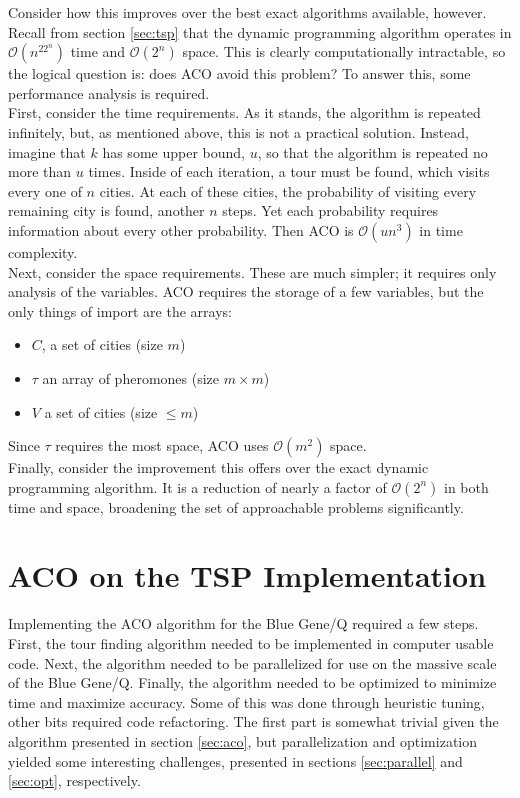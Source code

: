 \documentclass[twocolumn]{article}
\begin{document}
Consider how this improves over the best exact algorithms available, however. 
Recall from section
\ref{sec:tsp} that the dynamic programming algorithm operates in $\mathcal{O}(n^22^n)$ time
and $\mathcal{O}(2^n)$ space. This is clearly computationally intractable, so the logical
question is: does ACO avoid this problem? To answer this, some performance analysis is 
required. \\

First, consider the time requirements. As it stands, the algorithm is repeated 
infinitely, but, as mentioned above, 
this is not a practical solution. Instead, imagine that $k$ has some upper 
bound, $u$, so that the algorithm is repeated no more than $u$ times. Inside of each iteration, 
a tour must be found, which visits every one of $n$ cities. At each of these cities, 
the probability of visiting every remaining city is found, another $n$ steps. Yet each 
probability requires information about every other probability. Then ACO is %
$\mathcal{O}(un^3)$ in time complexity. \\

Next, consider the space requirements. These are much simpler; it requires only analysis 
of the variables. ACO requires the storage of a few variables, but the only things of 
import are the arrays:
\begin{itemize}
\item $C$, a set of cities (size $m$)
\item $\tau$ an array of pheromones (size $m\times m$)
\item $V$ a set of cities (size $\leq m$)
\end{itemize}
Since $\tau$ requires the most space, ACO uses $\mathcal{O}(m^2)$ space. \\

Finally, consider the improvement this offers over the exact dynamic programming 
algorithm. It is a reduction of nearly a factor of $\mathcal{O}(2^n)$ in both time
and space, broadening the set of approachable problems significantly. 

\section{ACO on the TSP Implementation} \label{sub:acoimpl}

Implementing the ACO algorithm for the Blue Gene/Q required a few steps. First,
the tour finding algorithm needed to be implemented in computer usable code. 
Next, the algorithm needed to be parallelized for use on the massive scale of
the Blue Gene/Q. Finally, the algorithm needed to be optimized to minimize 
time and maximize accuracy. Some of this was done through heuristic tuning,
other bits required code refactoring. The first part is somewhat trivial
given the algorithm presented in section \ref{sec:aco}, but parallelization
and optimization yielded some interesting challenges, presented in sections
\ref{sec:parallel} and \ref{sec:opt}, respectively. 
\end{document}
